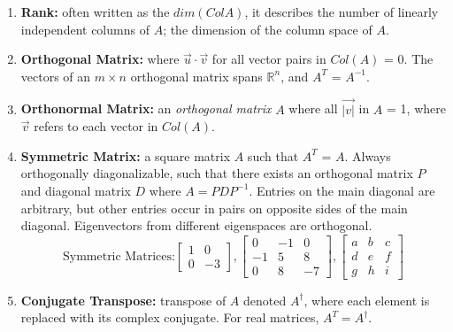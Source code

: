 \documentclass[12pt, reqno]{amsart}
\theoremstyle{definition}
\theoremstyle{remark}
\numberwithin{equation}{section}
\begin{document}
\begin{enumerate}
\item \textbf{Rank:} often written as the $dim(Col A)$, it describes the number of linearly independent columns of $A$; the dimension of the column space of $A$.\\
\item \textbf{Orthogonal Matrix:} where $\vec{u} \cdot \vec{v}$ for all vector pairs in $Col(A)$ = 0. The vectors of an $m \times n$ orthogonal matrix spans $\mathbb{R}^n$, and $A^T$ = $A^{-1}$.\\
\item \textbf{Orthonormal Matrix:} an \textit{orthogonal matrix} $A$ where all $\vec{|v|}$ in $A$ = 1, where $\vec{v}$ refers to each vector in $Col(A)$.\\
\item \textbf{Symmetric Matrix:} a square matrix $A$ such that $A^T$ = $A$. Always orthogonally diagonalizable, such that there exists an orthogonal matrix $P$ and diagonal matrix $D$ where $A = PDP^{-1}$. Entries on the main diagonal are arbitrary, but other entries occur in pairs on opposite sides of the main diagonal. Eigenvectors from different eigenspaces are orthogonal.\\
\begin{equation*}
\text{Symmetric Matrices:}
\begin{bmatrix}
1 & 0\\
0 & -3
\end{bmatrix},
\begin{bmatrix}
0 & -1 & 0\\
-1 & 5 & 8\\
0 & 8 & -7    
\end{bmatrix},
\begin{bmatrix}
a & b & c\\
d & e & f\\
g & h & i
\end{bmatrix}
\end{equation*}
\item \textbf{Conjugate Transpose:} transpose of $A$ denoted $A^\dagger$, where each element is replaced with its complex conjugate. For real matrices, $A^T = A^\dagger$.\\
\end{enumerate}
\end{document}
